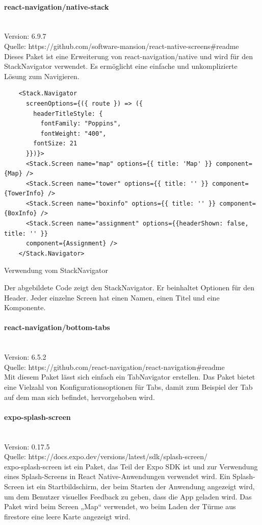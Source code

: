 \bigskip

\paragraph{react-navigation/native-stack}\mbox{}\\
Version: 6.9.7\\
Quelle: https://github.com/software-mansion/react-native-screens\#readme\\
Dieses Paket ist eine Erweiterung von react-navigation/native und wird für den StackNavigator verwendet. Es ermöglicht eine einfache und unkomplizierte Lösung zum Navigieren.

\begin{listing}[H]
  \begin{verbatim}
    <Stack.Navigator
      screenOptions={({ route }) => ({ 
        headerTitleStyle: {
          fontFamily: "Poppins",
          fontWeight: "400",
        fontSize: 21
      }})}>
      <Stack.Screen name="map" options={{ title: 'Map' }} component={Map} />
      <Stack.Screen name="tower" options={{ title: '' }} component={TowerInfo} />
      <Stack.Screen name="boxinfo" options={{ title: '' }} component={BoxInfo} />
      <Stack.Screen name="assignment" options={{headerShown: false, title: '' }} 
      component={Assignment} />
    </Stack.Navigator>
\end{verbatim}
  \caption{Verwendung vom StackNavigator}
  \label{lst:stacknavigator}
\end{listing}

Der abgebildete Code zeigt den StackNavigator. Er beinhaltet Optionen für den Header. Jeder einzelne Screen hat einen Namen, einen Titel und eine Komponente.

\bigskip

\paragraph{react-navigation/bottom-tabs}\mbox{}\\
Version: 6.5.2\\
Quelle: https://github.com/react-navigation/react-navigation\#readme\\
Mit diesem Paket lässt sich einfach ein TabNavigator erstellen. Das Paket bietet eine Vielzahl von Konfigurationsoptionen für Tabs, damit zum Beispiel der Tab auf dem man sich befindet, hervorgehoben wird.

\bigskip

\paragraph{expo-splash-screen}\mbox{}\\
Version: 0.17.5\\
Quelle: https://docs.expo.dev/versions/latest/sdk/splash-screen/\\
expo-splash-screen ist ein Paket, das Teil der Expo \Gls{SDK} ist und zur Verwendung eines Splash-Screens in React Native-Anwendungen verwendet wird. Ein Splash-Screen ist ein Startbildschirm, der beim Starten der Anwendung angezeigt wird, um dem Benutzer visuelles Feedback zu geben, dass die App geladen wird.
\noindent Das Paket wird beim Screen „Map“ verwendet, wo beim Laden der Türme aus firestore eine leere Karte angezeigt wird.
